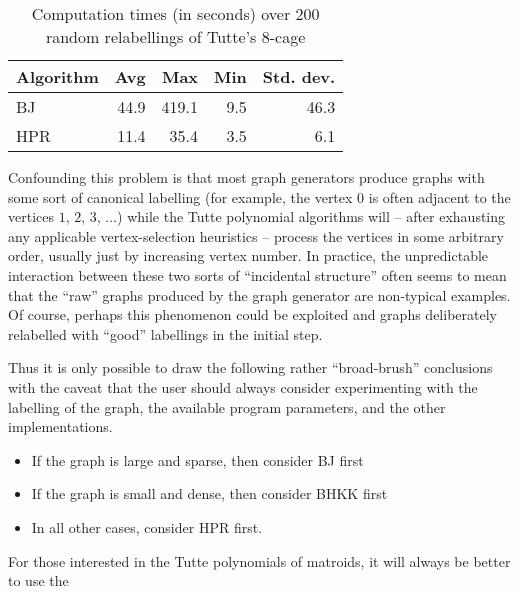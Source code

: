 \begin{table}
\begin{tabular}{l|rrrr}
Algorithm & Avg & Max & Min & Std. dev.\\
\hline
BJ & 44.9 & 419.1 & 9.5 & 46.3\\
HPR & 11.4 & 35.4 & 3.5 & 6.1\\
\end{tabular}
\caption{Computation times (in seconds) over 200 random relabellings of Tutte's 8-cage}
\label{tutcox}
\end{table}

Confounding this problem is that most graph generators produce graphs with some sort of canonical labelling (for example, the vertex $0$ is often adjacent to the vertices $1$, $2$, $3$, $\ldots$) while the Tutte polynomial algorithms will -- after exhausting any applicable vertex-selection heuristics -- process the vertices in some arbitrary order, usually just by increasing vertex number. In practice, the unpredictable interaction between these two sorts of ``incidental structure'' often seems to mean that the ``raw'' graphs produced by the graph generator are non-typical examples. Of course, perhaps  this phenomenon could be exploited and graphs deliberately relabelled with ``good'' labellings in the initial step.


Thus it is only possible to draw the following rather ``broad-brush'' conclusions with the caveat that the user should always consider experimenting with the labelling of the graph, the available program parameters, and the other implementations.

\begin{itemize}
\item If the graph is large and sparse, then consider BJ first
\item If the graph is small and dense, then consider BHKK first
\item In all other cases, consider HPR first.
\end{itemize}

For those interested in the Tutte polynomials of matroids, it will always be better to use the 



